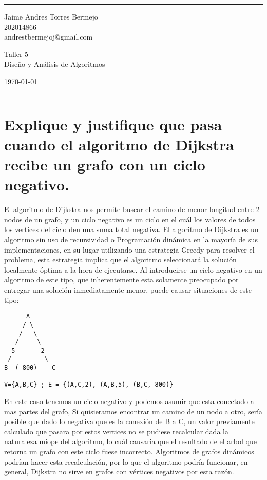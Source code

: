 \documentclass[a4paper]{article}
\begin{document}

\fancyhead[C]{}
\hrule \medskip %
\begin{minipage}{0.295\textwidth} 
\raggedright
\footnotesize
Jaime Andres Torres Bermejo \hfill\\   
202014866\hfill\\
andrestbermejoj@gmail.com
\end{minipage}
\begin{minipage}{0.4\textwidth} 
\centering 
\large 
Taller 5\\ 
\normalsize 
Diseño y Análisis de Algoritmos\\ 
\end{minipage}
\begin{minipage}{0.295\textwidth} 
\raggedleft
\today\hfill\\
\end{minipage}
\medskip\hrule 
\bigskip

\section{Explique y justifique que pasa cuando el algoritmo de Dijkstra recibe un grafo con
un ciclo negativo.}

El algoritmo de Dijkstra nos permite buscar el camino de menor longitud entre 2 nodos de un grafo,
y un ciclo negativo es un ciclo en el cuál los valores de todos los vertices del ciclo
den una suma total negativa. El algoritmo de Dijkstra es un algoritmo sin uso de 
recursividad o Programación dinámica en la mayoría de sus implementaciones, en su lugar utilizando
una estrategia Greedy para resolver el problema, esta estrategia implica que el algoritmo
seleccionará la solución localmente óptima a la hora de ejecutarse. Al introducirse un ciclo negativo
en un algoritmo de este tipo, que inherentemente esta solamente preocupado por entregar una solución
inmediatamente menor, puede causar situaciones de este tipo:
    
\begin{verbatim}
      A
     / \
    /   \
   /     \
  5       2
 /         \
B--(-800)--  C

V={A,B,C} ; E = {(A,C,2), (A,B,5), (B,C,-800)}
\end{verbatim}

En este caso tenemos un ciclo negativo y podemos asumir que esta conectado a mas partes
del grafo,  Si quisieramos encontrar un camino de un nodo a otro, sería 
posible que dado lo negativa que es la conexión de B a C, un valor previamente calculado
que pasara por estos vertices no se pudiese recalcular dada la naturaleza miope
del algoritmo, lo cuál causaria que el resultado de el arbol que retorna un grafo con este
ciclo fuese incorrecto. Algoritmos de grafos dinámicos podrían hacer esta recalculación,
por lo que el algoritmo podría funcionar, en general, Dijkstra no sirve en grafos con
vértices negativos por esta razón.
\end{document}
